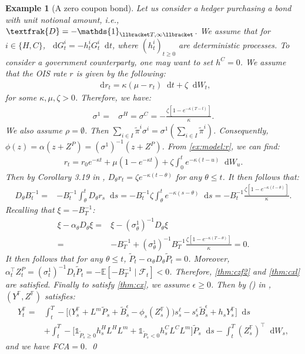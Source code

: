 \documentclass[a4paper, 11pt]{article}              %
\numberwithin{equation}{section}
\theoremstyle{plain}
\newcommand{\1}{\mathds{1}}
\newcommand{\calF}{\mathcal{F}}
\newcommand{\frD}{\textfrak{D}}
\newcommand{\Bt}{\tilde{B}}
\newcommand{\pt}{\tilde{P}}
\newcommand{\pit}{\tilde{\pi}}
\newcommand{\dsE}{\mathbb{E}}
\newcommand{\dsF}{\mathbb{F}}
\newcommand{\IT}{^i_t}
\theoremstyle{plain}
\theoremstyle{definition}
\newtheorem{example}[thm]{Example}
\theoremstyle{plain}
\newtheorem{example}{Example}
\newcommand*\df{\mathop{}\!\mathrm{d}}
\newcommand{\rom}[1]{\lowercase\expandafter{\romannumeral #1\relax}}
\begin{document}
\begin{example}[A zero coupon bond] \label{example:treasury} Let us consider
  a hedger purchasing a  bond with unit notional amount, i.e.,
  $\frD = -\1_{\llbracket T, \infty\llbracket }$. We assume that for
  $i \in \{H, C\}$, $\df G\IT = -h\IT G\IT \df t$, where $(h^i_t)_{t \geq0}$ are
  deterministic processes. To consider a government counterparty, one may want
  to set $h^C=0$. We assume that the OIS rate $r$ is given by the following:
\begin{align}
  \df r_t = \kappa(\mu-r_t)\df t + \zeta\df W_t, \label{ex:model:r}
\end{align}
for some $\kappa , \mu , \zeta >0$. Therefore, we have:
\begin{align}
  \sigma^1 =& \sigma^H = \sigma^C=-\frac{\zeta [1-e^{-\kappa(T-t)}]}{\kappa}.\nonumber 
\end{align} 
We also assume $\rho =\emptyset$. Then $\sum_{i \in I}\pit^i\sigma^i = \sigma^1(\sum_{i \in I}\pit^i)$. Consequently,
$  \phi(z) = \alpha(z+Z^P) = (\sigma^1)^{-1}(z+Z^P)$. 
From \cref{ex:model:r}, we can find:
\begin{align}
 r_t = r_0e^{-\kappa t} + \mu(1-e^{-\kappa t}) + \zeta \int_{0}^{t}e^{-\kappa(t-u)}\df W_u.\nonumber  
\end{align}
Then by Corollary 3.19 in \cite{di2009malliavin}, 
$D_\theta r_t = \zeta e^{-\kappa(t-\theta)}$ for any $\theta \leq t$. It then follows that:
\begin{align}
  D_\theta B^{-1}_t =& -B_t^{-1}\int_{\theta}^{t}D_\theta r_s \df s = -B_t^{-1}\zeta \int_{\theta}^{t}e^{-\kappa(s-\theta)} \df s
  =-B_t^{-1}\frac{\zeta [1-e^{-\kappa(t-\theta)}]}{\kappa}.\nonumber 
\end{align}
Recalling that $\xi =  -B^{-1}_T$:
\begin{align}
  \xi - \alpha_\theta D_\theta \xi =&  \xi - (\sigma^1_\theta)^{-1} D_\theta \xi\nonumber \\
  =&-B_T^{-1}+(\sigma^1_\theta)^{-1}B_T^{-1}\frac{\zeta [1-e^{-\kappa(T-\theta)}]}{\kappa}=0.\nonumber 
\end{align}
It then follows that for any $\theta \leq t$, $\pt_t- \alpha_\theta D_\theta\pt_t=0$. Moreover,
  $\alpha_t^\top Z^P_t =  (\sigma^1_t)^{-1} D_t\pt_t  = -\dsE[-B_T^{-1}\mid\calF_t]<0$. Therefore,
  \cref{thm:czf2} and \cref{thm:cxl} are satisfied.
  Finally to satisfy \cref{thm:cx}, we assume $\epsilon \geq0$. 
Then by (\rom{2}) in , $(Y^\dsF, Z^\dsF)$ satisfies:
\begin{align}
  Y^\dsF_t =& \int_{t}^{T} -\bigg[\Big(Y^\dsF_s
              +L^m\pt_s+\Bt^\epsilon_s-\phi_s(Z^\dsF_s)\Big)s^{\ell}_s
              -s^\epsilon_s\Bt^\epsilon_s+h_sY^\dsF_s\bigg]\df s\nonumber\\
  &+\int_{t}^{T}
    -\big[\1_{\pt_s\geq0}h^H_sL^HL^m+\1_{\pt_s<0}h^C_sL^CL^m\big]\pt_s\df s
    -\int_{t}^{T}(Z^\dsF_s)^\top\df W_s, \label{ex1:yf}
\end{align}
and we have FCA$=0$. \qed 
\end{example}
\end{document}
